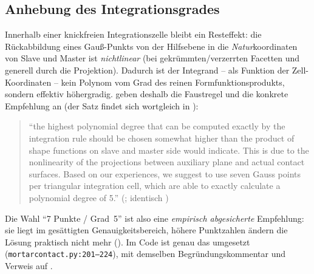 \documentclass[a4paper,11pt]{article}
\newcommand{\file}[1]{\texttt{\small #1}}
\begin{document}
\subsection{Anhebung des Integrationsgrades}
Innerhalb einer knickfreien Integrationszelle bleibt ein Resteffekt: die Rückabbildung eines
Gauß-Punkts von der Hilfsebene in die \emph{Natur}koordinaten von Slave und Master ist
\emph{nichtlinear} (bei gekrümmten/verzerrten Facetten und generell durch die Projektion). Dadurch
ist der Integrand -- als Funktion der Zell-Koordinaten -- kein Polynom vom Grad des reinen
Formfunktionsprodukts, sondern effektiv höhergradig. \citet{farah2015} geben deshalb die
Faustregel und die konkrete Empfehlung an (der Satz findet sich wortgleich in \citealt[Anh.~A.1.1]{farah}):
\begin{quote}
\small ``the highest polynomial degree that can be computed exactly by the integration rule should
be chosen somewhat higher than the product of shape functions on slave and master side would
indicate. This is due to the nonlinearity of the projections between auxiliary plane and actual
contact surfaces. Based on our experiences, we suggest to use seven Gauss points per triangular
integration cell, which are able to exactly calculate a polynomial degree of 5.''
\hfill (\citealp[S.~217]{farah2015}; identisch \citealp[Anh.~A.1.1, S.~209--210]{farah})
\end{quote}
Die Wahl ``7 Punkte / Grad~5'' ist also eine \emph{empirisch abgesicherte} Empfehlung: sie liegt im
gesättigten Genauigkeitsbereich, höhere Punktzahlen ändern die Lösung praktisch nicht mehr
(\citealp[Kap.~6]{farah}). Im Code ist genau das umgesetzt (\file{mortarcontact.py:\allowbreak{}201--224}), mit
demselben Begründungskommentar und Verweis auf \citet[Anh.~A.1.1]{farah}.
\end{document}
